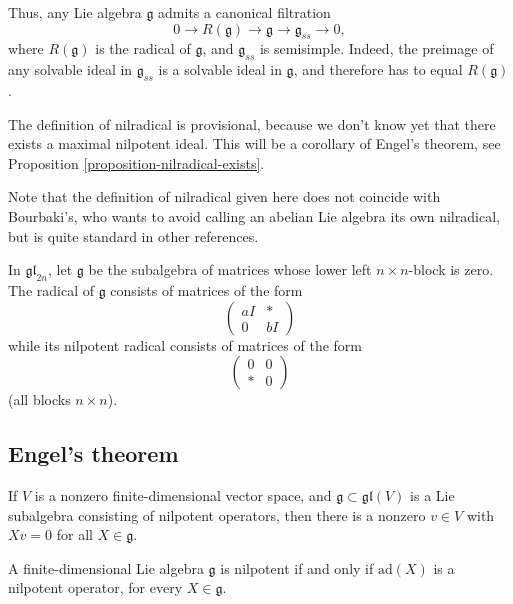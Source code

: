 Thus, any Lie algebra $\mathfrak g$ admits a canonical filtration
\begin{equation}
 \label{equation-filtration-solvable-semisimple}
0 \to R(\mathfrak g) \to \mathfrak g \to \mathfrak g_{ss} \to 0,
\end{equation}
where $R(\mathfrak g)$ is the radical of $\mathfrak g$, and $\mathfrak g_{ss}$ is semisimple. Indeed, the preimage of any solvable ideal in $\mathfrak g_{ss}$ is a solvable ideal in $\mathfrak g$, and therefore has to equal $R(\mathfrak g)$.


The definition of nilradical is provisional, because we don't know yet that there exists a maximal nilpotent ideal. This will be a corollary of Engel's theorem, see Proposition \ref{proposition-nilradical-exists}.

Note that the definition of nilradical given here does not coincide with Bourbaki's, who wants to avoid calling an abelian Lie algebra its own nilradical, but is quite standard in other references.

\begin{example}
 \label{example-radical}
 In $\mathfrak{gl}_{2n}$, let $\mathfrak g$ be the subalgebra of matrices whose lower left $n\times n$-block is zero. The radical of $\mathfrak g$ consists of matrices of the form
 $$ \begin{pmatrix}
     aI & * \\ 0 & bI
    \end{pmatrix}$$
 while its nilpotent radical consists of matrices of the form 
 $$ \begin{pmatrix}
     0 & 0 \\ *& 0
    \end{pmatrix}$$
 (all blocks $n\times n$).  

\end{example}

\subsection{Engel's theorem}
\label{subsection-Engel-theorem}

\begin{theorem}
 \label{theorem-Engel}
If $V$ is a nonzero finite-dimensional vector space, and $\mathfrak g\subset \mathfrak{gl}(V)$ is a Lie subalgebra consisting of nilpotent operators, then there is a nonzero $v\in V$ with $Xv = 0$ for all $X\in \mathfrak g$.
 
A finite-dimensional Lie algebra $\mathfrak g$ is nilpotent if and only if $\text{ad}(X)$ is a nilpotent operator, for every $X\in \mathfrak g$. 
\end{theorem}


